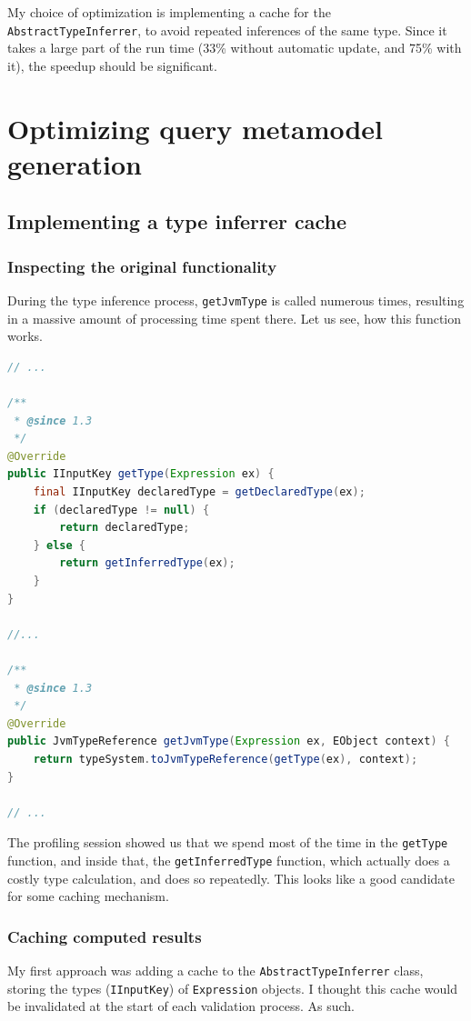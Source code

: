 \documentclass[11pt,a4paper,oneside]{report}
\begin{document}
My choice of optimization is implementing a cache for the
\texttt{AbstractTypeInferrer}, to avoid repeated inferences of the same type.
Since it takes a large part of the run time (33\% without automatic update,
and 75\% with it), the speedup should be significant.

\chapter{Optimizing query metamodel generation}
\section{Implementing a type inferrer cache}
\subsection{Inspecting the original functionality}
During the type inference process, \texttt{getJvmType} is called numerous times,
resulting in a massive amount of processing time spent there. Let us see, how
this function works.

\begin{lstlisting}[language=java]
// ...

/**
 * @since 1.3
 */
@Override
public IInputKey getType(Expression ex) {
    final IInputKey declaredType = getDeclaredType(ex);
    if (declaredType != null) {
        return declaredType;
    } else {
        return getInferredType(ex);
    }
}

//...

/**
 * @since 1.3
 */
@Override
public JvmTypeReference getJvmType(Expression ex, EObject context) {
    return typeSystem.toJvmTypeReference(getType(ex), context);
}

// ...
\end{lstlisting}

The profiling session showed us that we spend most of the time in the
\texttt{getType} function, and inside that, the \texttt{getInferredType}
function, which actually does a costly type calculation, and does so repeatedly.
This looks like a good candidate for some caching mechanism.

\subsection{Caching computed results}
My first approach was adding a cache to the \texttt{AbstractTypeInferrer} class,
storing the types (\texttt{IInputKey}) of \texttt{Expression} objects. I thought
this cache would be invalidated at the start of each validation process. As
such.
\end{document}
